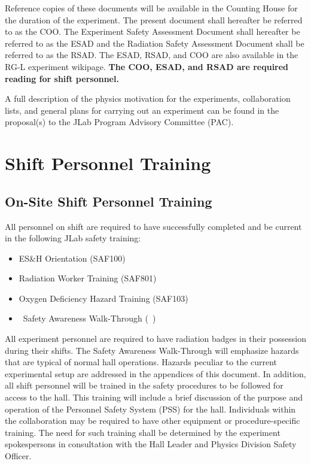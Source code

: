 \documentclass[11pt]{article}
\begin{document}
Reference copies of these documents will be available in the Counting House for the duration of
the experiment. The present document shall hereafter be referred to as the COO. The Experiment
Safety Assessment Document shall hereafter be referred to as the ESAD and the Radiation Safety
Assessment Document shall be referred to as the RSAD. The ESAD, RSAD, and COO are also available
in the RG-L experiment wikipage. {\bf The COO, ESAD, and RSAD are required reading for shift
  personnel.}

A full description of the physics motivation for the experiments, collaboration 
lists, and general plans for carrying out an experiment can be found in the
proposal(s) to the JLab Program Advisory Committee (PAC). 

\section{Shift Personnel Training}
\indent
\subsection{On-Site Shift Personnel Training}

All personnel on shift are required to have successfully completed and be 
current in the following JLab safety training:

\begin{itemize}

\item ES\&H Orientation (SAF100) 

\item Radiation Worker Training (SAF801) 

\item Oxygen Deficiency Hazard Training (SAF103) 

\item \HALL\ Safety Awareness Walk-Through (\AWARENESS\ $\!\!$)

\end{itemize}

 All experiment personnel are 
required to have radiation badges in their possession during their shifts. 
The Safety Awareness Walk-Through will
emphasize hazards that are typical of normal hall operations.
Hazards  peculiar to the current experimental setup are addressed in the appendices 
of this document. 
In addition, all shift personnel will be trained in the safety procedures to be
followed for access to the hall. This
training will include a brief discussion of the purpose and operation of the
Personnel Safety System (PSS) for the hall. 
Individuals within the collaboration may be required to have other equipment 
or procedure-specific training. The need for such
training shall be determined by the experiment spokespersons in consultation 
with the Hall Leader and Physics Division Safety Officer.
\end{document}
